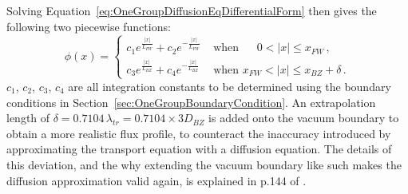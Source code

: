 \documentclass[a4paper, 12pt]{article}
\begin{document}
Solving Equation~\ref{eq:OneGroupDiffusionEqDifferentialForm} then gives the following two piecewise functions:
\begin{equation}\label{eq:OneGroupSwitchCase}
\phi(x) =
\begin{cases}
    c_1 e^{\frac{|x|}{L_{FW}}} + c_2 e^{-\frac{|x|}{L_{FW}}} & \text{ when }\quad\;     0<|x|\le x_{FW}\,,\\
    c_3 e^{\frac{|x|}{L_{BZ}}} + c_4 e^{-\frac{|x|}{L_{BZ}}} & \text{ when }x_{FW}<|x|\le x_{BZ} + \delta \,.
\end{cases}
\end{equation}
$c_1$, $c_2$, $c_3$, $c_4$ are all integration constants to be determined using the boundary conditions in Section~\ref{sec:OneGroupBoundaryCondition}.
An extrapolation length of $\delta = 0.7104\,\lambda_{tr} = 0.7104\times 3D_{BZ}$ is added onto the vacuum boundary to obtain a more realistic flux profile, to counteract the inaccuracy introduced by approximating the transport equation with a diffusion equation.
The details of this deviation, and the why extending the vacuum boundary like such makes the diffusion approximation valid again, is explained in p.144 of \cite{Duderstadt}.
\end{document}
